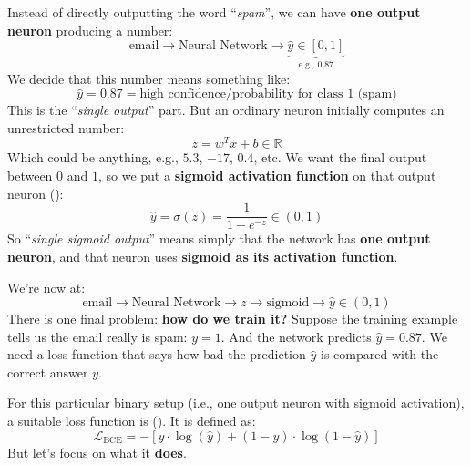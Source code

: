\begin{itemize}
        Instead of directly outputting the word ``\emph{spam}'', we can have \textbf{one output neuron} producing a number:
        \begin{equation*}
            \text{email} \to \text{Neural Network} \to \underbrace{\hat{y} \in [0, 1]}_{\text{e.g., } 0.87}
        \end{equation*}
        We decide that this number means something like:
        \begin{equation*}
            \hat{y} = 0.87 = \text{high confidence/probability for class 1 (spam)}
        \end{equation*}
        This is the ``\emph{single output}'' part. But an ordinary neuron initially computes an unrestricted number:
        \begin{equation*}
            z = w^{T} x + b \in \mathbb{R}
        \end{equation*}
        Which could be anything, e.g., $5.3$, $-17$, $0.4$, etc. We want the final output between $0$ and $1$, so we put a \textbf{sigmoid activation function} on that output neuron ():
        \begin{equation*}
            \hat{y} = \sigma(z) = \frac{1}{1 + e^{-z}} \in (0, 1)
        \end{equation*}
        So ``\emph{single sigmoid output}'' means simply that the network has \textbf{one output neuron}, and that neuron uses \textbf{sigmoid as its activation function}.

        We're now at:
        \begin{equation*}
            \text{email} \to \text{Neural Network} \to z \to \text{sigmoid} \to \hat{y} \in (0, 1)
        \end{equation*}
        There is one final problem: \textbf{how do we train it?} Suppose the training example tells us the email really is spam: $y = 1$. And the network predicts $\hat{y} = 0.87$. We need a loss function that says how bad the prediction $\hat{y}$ is compared with the correct answer $y$.

        For this particular binary setup (i.e., one output neuron with sigmoid activation), a suitable loss function is  (). It is defined as:
        \begin{equation*}
            \mathcal{L}_{\text{BCE}} = - \left[y \cdot \log(\hat{y}) + (1 - y) \cdot \log(1 - \hat{y})\right]
        \end{equation*}
        But let's focus on what it \textbf{does}.


\end{itemize}
